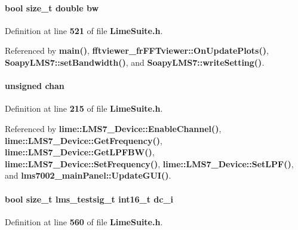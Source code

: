 \paragraph[{bw}]{\setlength{\rightskip}{0pt plus 5cm}bool size\+\_\+t double bw}\label{group__FN__HIGH__LVL_ga72fb354f0be1ddb0d4833e33819f9a00}


Definition at line {\bf 521} of file {\bf Lime\+Suite.\+h}.



Referenced by {\bf main()}, {\bf fftviewer\+\_\+fr\+F\+F\+Tviewer\+::\+On\+Update\+Plots()}, {\bf Soapy\+L\+M\+S7\+::set\+Bandwidth()}, and {\bf Soapy\+L\+M\+S7\+::write\+Setting()}.

\paragraph[{chan}]{\setlength{\rightskip}{0pt plus 5cm}unsigned chan}\label{group__FN__HIGH__LVL_gafeb55c5de97f9ab2ccf6de9b3144ccfc}


Definition at line {\bf 215} of file {\bf Lime\+Suite.\+h}.



Referenced by {\bf lime\+::\+L\+M\+S7\+\_\+\+Device\+::\+Enable\+Channel()}, {\bf lime\+::\+L\+M\+S7\+\_\+\+Device\+::\+Get\+Frequency()}, {\bf lime\+::\+L\+M\+S7\+\_\+\+Device\+::\+Get\+L\+P\+F\+B\+W()}, {\bf lime\+::\+L\+M\+S7\+\_\+\+Device\+::\+Set\+Frequency()}, {\bf lime\+::\+L\+M\+S7\+\_\+\+Device\+::\+Set\+L\+P\+F()}, and {\bf lms7002\+\_\+main\+Panel\+::\+Update\+G\+U\+I()}.

\paragraph[{dc\+\_\+i}]{\setlength{\rightskip}{0pt plus 5cm}bool size\+\_\+t {\bf lms\+\_\+testsig\+\_\+t} int16\+\_\+t dc\+\_\+i}\label{group__FN__HIGH__LVL_gadb235d08b497acd79d23d37db020fbb3}


Definition at line {\bf 560} of file {\bf Lime\+Suite.\+h}.

